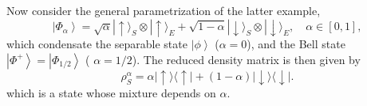\indent Now consider the general parametrization of the latter example,
\begin{equation}
\left|\Phi_{\alpha}\right\rangle=\sqrt{\alpha}|\uparrow\rangle_{S} \otimes|\uparrow\rangle_{E}+\sqrt{1-\alpha}|\downarrow\rangle_{S} \otimes|\downarrow\rangle_{E}, \quad \alpha \in[0,1],
\label{CH1:Entanglement_example_4}
\end{equation}
which condensate the separable state $\left|\phi\right\rangle$ ($\alpha=0$), and the Bell state$\left|\Phi^{+}\right\rangle=\left|\Phi_{1 / 2}\right\rangle$ ( $\alpha=1/2$). The reduced density matrix is then given by
\begin{equation}
\rho_{S}^{\alpha}=\alpha|\uparrow\rangle\langle\uparrow|+(1-\alpha)| \downarrow\rangle\langle\downarrow|.
\label{CH1:Entanglement_example_5}
\end{equation}
which is a state whose mixture depends on $\alpha$.\\

